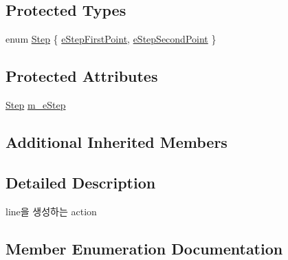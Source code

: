 \subsection*{Protected Types}
\begin{DoxyCompactItemize}
\item 
enum \hyperlink{class_c_g3_d_action_create_line_a784596d7cc159c7acb99e58abbfba9c7}{Step} \{ \hyperlink{class_c_g3_d_action_create_line_a784596d7cc159c7acb99e58abbfba9c7aba977110ad5375a92738b70af6d11132}{e\+Step\+First\+Point}, 
\hyperlink{class_c_g3_d_action_create_line_a784596d7cc159c7acb99e58abbfba9c7a5819ee4d473ad1a919cd5a5504d7e427}{e\+Step\+Second\+Point}
 \}
\end{DoxyCompactItemize}
\subsection*{Protected Attributes}
\begin{DoxyCompactItemize}
\item 
\hyperlink{class_c_g3_d_action_create_line_a784596d7cc159c7acb99e58abbfba9c7}{Step} \hyperlink{class_c_g3_d_action_create_line_a9016c274e361d0c161ac2d797c94b966}{m\+\_\+e\+Step}
\end{DoxyCompactItemize}
\subsection*{Additional Inherited Members}


\subsection{Detailed Description}

\begin{DoxyItemize}
\item line을 생성하는 action 
\end{DoxyItemize}

\subsection{Member Enumeration Documentation}
\hypertarget{class_c_g3_d_action_create_line_a784596d7cc159c7acb99e58abbfba9c7}{}
